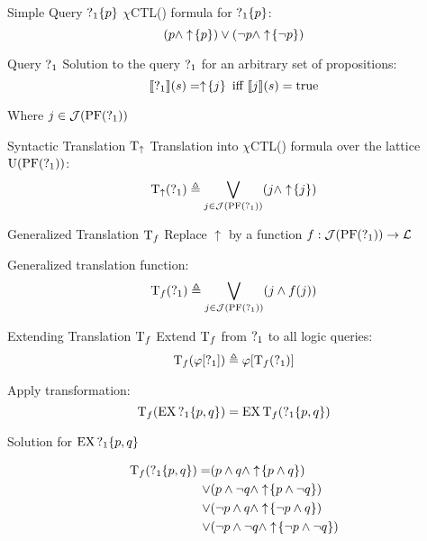 \begin{frame}{Simple Query $\operatorname{?}_1\{p\}$}
  $\chi$CTL(\mcL) formula for $\operatorname{?}_1\{p\}$:
  \[ (p \land \uparrow \! \left\{ p \right\}) \lor (\lnot p \land \uparrow \! \left\{ \lnot p \right\}) \]
\end{frame}

\begin{frame}{Query $\operatorname{?}_1$}
  Solution to the query $\operatorname{?}_1$ for an arbitrary set of propositions:
  \[ \llbracket \operatorname{?}_1 \rrbracket (s) = \uparrow \! \left\{ j \right\} \text{ iff } \llbracket j \rrbracket (s) = \operatorname{true}
  \]
  
  Where $j\in\mathcal{J}(\operatorname{PF}(\operatorname{?}_1))$
\end{frame}

\begin{frame}{Syntactic Translation $\operatorname{T}_\uparrow$}
  Translation into $\chi$CTL(\mcL) formula over the lattice $\operatorname{U}(\operatorname{PF}(\operatorname{?}_1))$:
  \[ 
    \operatorname{T}_\uparrow(\operatorname{?}_1) \triangleq \bigvee_{j\in\mathcal{J}(\operatorname{PF}(\operatorname{?}_1))} (j \land \uparrow \! \left\{ j \right\})
  \]
\end{frame}

\begin{frame}{Generalized Translation $\operatorname{T}_f$}
  Replace $\uparrow$ by a function $f : \mathcal{J}(\operatorname{PF}(\operatorname{?}_1)) \to \mathcal{L}$

  Generalized translation function:
  \[ 
    \operatorname{T}_f(\operatorname{?}_1) \triangleq \bigvee_{j\in\mathcal{J}(\operatorname{PF}(\operatorname{?}_1))} (j \land f(j))
  \]
\end{frame}

\begin{frame}{Extending Translation $\operatorname{T}_f$}
  Extend $\operatorname{T}_f$ from $\operatorname{?}_1$ to all logic queries:
  \[ 
    \operatorname{T}_f(\varphi[\operatorname{?}_1]) \triangleq \varphi[\operatorname{T}_f(\operatorname{?}_1)]
  \]
  
  \begin{example}
    Apply transformation:
    \[ \operatorname{T}_f(\operatorname{EX} \operatorname{?}_1\{p,q\}) = \operatorname{EX}\operatorname{T}_f( \operatorname{?}_1\{p,q\}) \]
  \end{example}
\end{frame}

\begin{frame}{Solution for $\operatorname{EX} \operatorname{?}_1\{p,q\}$}
  \begin{example}
    \begin{align*}
      \operatorname{T}_f( \operatorname{?}_1\{p,q\}) 
        =   &(p \land q \land \uparrow \! \left\{ p\land q \right\}) \\
        \lor&(p \land \lnot q \land \uparrow \! \left\{ p\land \lnot q \right\}) \\
        \lor&(\lnot p \land q \land \uparrow \! \left\{ \lnot p\land q \right\}) \\
        \lor&(\lnot p \land \lnot q \land \uparrow \! \left\{ \lnot p\land \lnot q \right\})
    \end{align*}
  \end{example}
\end{frame}

